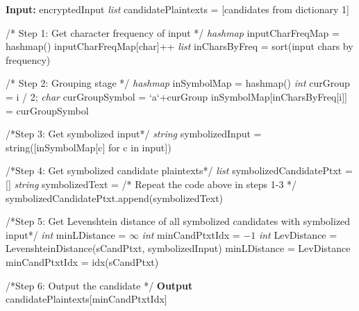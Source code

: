 \documentclass[12pt]{article}
\begin{document}
\begin{algorithmic}[1]
\item[\textbf{Input:} encryptedInput]
    \State \emph{list} candidatePlaintexts = [candidates from dictionary 1]
    \item[]

    \State /* Step 1: Get character frequency of input */
    \State \emph{hashmap} inputCharFreqMap = hashmap() 
        \State inputCharFreqMap[char]++
    \EndFor
    \State \emph{list} inCharsByFreq = sort(input chars by frequency)
    \item[]

    \State /* Step 2: Grouping stage */
    \State \emph{hashmap} inSymbolMap = hashmap()
        \State\emph{int} curGroup = i / 2;
        \State\emph{char} curGroupSymbol = `a`+curGroup
        \State inSymbolMap[inCharsByFreq[i]] = curGroupSymbol
    \EndFor

    \item[]
    \State /*Step 3: Get symbolized input*/
    \State \emph{string} symbolizedInput = string([inSymbolMap[c] for c in input])

    \item[]
    \State /*Step 4: Get symbolized candidate plaintexts*/
    \State \emph{list} symbolizedCandidatePtxt = []
        \State \emph{string} symbolizedText = /* Repeat the code above in steps 1-3 */
        symbolizedCandidatePtxt.append(symbolizedText)
    \EndFor

    \item[]
    \State /*Step 5: Get Levenshtein distance of all symbolized candidates with symbolized input*/
    \State \emph{int} minLDistance = $\infty$
    \State \emph{int} minCandPtxtIdx = $-1$
        \State \emph{int} LevDistance = LevenshteinDistance(sCandPtxt, symbolizedInput) 
            \State minLDistance = LevDistance 
            \State minCandPtxtIdx = idx(sCandPtxt)
        \EndIf
    \EndFor

    \item[]
    \State /*Step 6: Output the candidate */
    \State \textbf{Output} candidatePlaintexts[minCandPtxtIdx]
\end{algorithmic}
\end{document}
